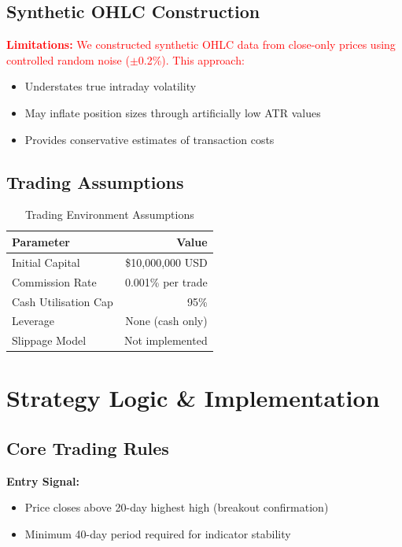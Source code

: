 \documentclass[11pt,a4paper]{article}
\begin{document}
\subsection{Synthetic OHLC Construction}

\noindent \textcolor{red}{\textbf{Limitations:} We constructed synthetic OHLC data from close-only prices using controlled random noise ($\pm$0.2\%). This approach:}
\begin{itemize}
\item Understates true intraday volatility
\item May inflate position sizes through artificially low ATR values
\item Provides conservative estimates of transaction costs
\end{itemize}


\subsection{Trading Assumptions}
\begin{table}[H]
\centering
\begin{tabular}{lr}
\toprule
\textbf{Parameter} & \textbf{Value} \\
\midrule
Initial Capital & \$10,000,000 USD \\
Commission Rate & 0.001\% per trade \\
Cash Utilisation Cap & 95\% \\
Leverage & None (cash only) \\
Slippage Model & Not implemented \\
\bottomrule
\end{tabular}
\caption{Trading Environment Assumptions}
\end{table}

\section{Strategy Logic \& Implementation}

\subsection{Core Trading Rules}
\noindent
\textbf{Entry Signal:}
\begin{itemize}[leftmargin=*]
\item Price closes above 20-day highest high (breakout confirmation)  
\item Minimum 40-day period required for indicator stability
\end{itemize}
\end{document}
